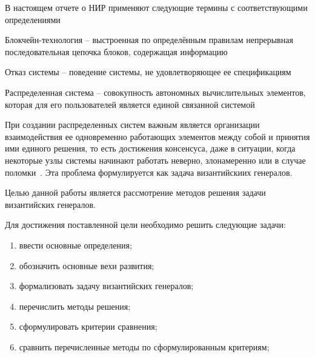 
В настоящем отчете о НИР применяют следующие термины с соответствующими определениями

\noindent
Блокчейн-технология -- выстроенная по определённым правилам непрерывная последовательная цепочка блоков, содержащая информацию~\cite{blockchain}

\noindent
Отказ системы -- поведение системы, не удовлетворяющее ее спецификациям~\cite{lec}

\noindent
Распределенная система -- совокупность автономных вычислительных элементов, которая для его пользователей является единой связанной системой~\cite{Tanenbaum}


\clearpage
{}

При создании распределенных систем важным является организации взаимодействия ее одновременно работающих элементов между собой и принятия ими единого решения, то есть достижения консенсуса, даже в ситуации, когда некоторые узлы системы начинают работать неверно, злонамеренно или в случае поломки~\cite{distrDataProc}. Эта проблема формулируется как задача византийскиих генералов.

Целью данной работы является рассмотрение методов решения задачи византийских генералов.

Для достижения поставленной цели необходимо решить следующие задачи:
\begin{enumerate}[label={\arabic*)}]
	\item ввести основные определения;
	\item обозначить основные вехи развития;
	\item формализовать задачу византийских генералов;
	\item перечислить методы решения;
	\item сформулировать критерии сравнения;
	\item сравнить перечисленные методы по сформулированным критериям;
\end{enumerate}

\clearpage
